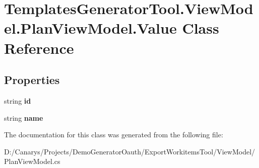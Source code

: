 \hypertarget{class_templates_generator_tool_1_1_view_model_1_1_plan_view_model_1_1_value}{}\section{Templates\+Generator\+Tool.\+View\+Model.\+Plan\+View\+Model.\+Value Class Reference}
\label{class_templates_generator_tool_1_1_view_model_1_1_plan_view_model_1_1_value}
\subsection*{Properties}
\begin{DoxyCompactItemize}
\item 
\mbox{\label{class_templates_generator_tool_1_1_view_model_1_1_plan_view_model_1_1_value_a27b0efd010e1fc47960137582dde7461}} 
string {\bfseries id}
\item 
\mbox{\label{class_templates_generator_tool_1_1_view_model_1_1_plan_view_model_1_1_value_a9a391f8c98105c91d3cdfcf77edc8a42}} 
string {\bfseries name}
\end{DoxyCompactItemize}


The documentation for this class was generated from the following file\+:\begin{DoxyCompactItemize}
\item 
D\+:/\+Canarys/\+Projects/\+Demo\+Generator\+Oauth/\+Export\+Workitems\+Tool/\+View\+Model/Plan\+View\+Model.\+cs\end{DoxyCompactItemize}
